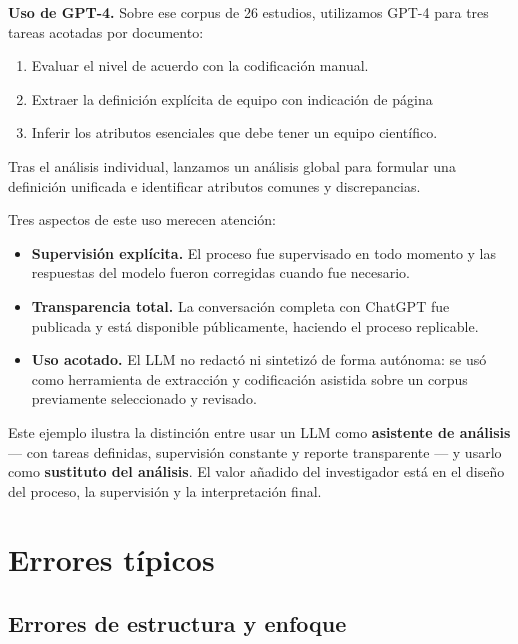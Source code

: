 \documentclass[
]{book}
\providecommand{\tightlist}{%
  \setlength{\itemsep}{0pt}\setlength{\parskip}{0pt}}
\begin{document}
\textbf{Uso de GPT-4.} Sobre ese corpus de 26 estudios, utilizamos GPT-4 para tres tareas acotadas por documento:

\begin{enumerate}
\def\labelenumi{\arabic{enumi}.}
\tightlist
\item
  Evaluar el nivel de acuerdo con la codificación manual.
\item
  Extraer la definición explícita de equipo con indicación de página
\item
  Inferir los atributos esenciales que debe tener un equipo científico.
\end{enumerate}

Tras el análisis individual, lanzamos un análisis global para formular una definición unificada e identificar atributos comunes y discrepancias.

Tres aspectos de este uso merecen atención:

\begin{itemize}
\tightlist
\item
  \textbf{Supervisión explícita.} El proceso fue supervisado en todo momento y las respuestas del modelo fueron corregidas cuando fue necesario.
\item
  \textbf{Transparencia total.} La conversación completa con ChatGPT fue publicada y está disponible públicamente, haciendo el proceso replicable.
\item
  \textbf{Uso acotado.} El LLM no redactó ni sintetizó de forma autónoma: se usó como herramienta de extracción y codificación asistida sobre un corpus previamente seleccionado y revisado.
\end{itemize}

Este ejemplo ilustra la distinción entre usar un LLM como \textbf{asistente de análisis} --- con tareas definidas, supervisión constante y reporte transparente --- y usarlo como \textbf{sustituto del análisis}. El valor añadido del investigador está en el diseño del proceso, la supervisión y la interpretación final.

\section{Errores típicos}\label{errores-tuxedpicos}

\subsection{Errores de estructura y enfoque}\label{errores-de-estructura-y-enfoque}
\end{document}
